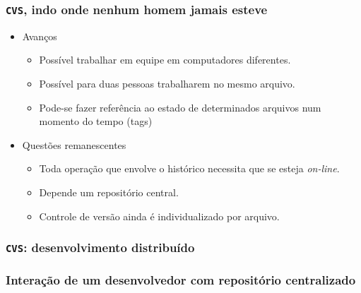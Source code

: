 \documentclass{beamer}
\newcommand{\cvs}{\texttt{CVS}}
\begin{document}
\begin{frame}
  \frametitle{\cvs, indo onde nenhum homem jamais esteve}
  \begin{itemize}
    \item Avanços
      \begin{itemize}
        \item Possível trabalhar em equipe em computadores
          diferentes.
        \item Possível para duas pessoas trabalharem no mesmo arquivo.
        \item Pode-se fazer referência ao estado de determinados
          arquivos num momento do tempo (tags)
      \end{itemize}
    \item Questões remanescentes
      \begin{itemize}
        \item Toda operação que envolve o histórico necessita que se
          esteja \emph{on-line}.
        \item Depende um repositório central.
        \item Controle de versão ainda é individualizado por arquivo.
      \end{itemize}
  \end{itemize}
\end{frame}

\begin{frame}
  \frametitle{\cvs: desenvolvimento distribuído}
  \begin{figure}[h]
    \begin{center}
    \end{center}
    \label{fig:cvs}
  \end{figure}
\end{frame}

\begin{frame}
  \frametitle{Interação de um desenvolvedor com repositório centralizado}
  \begin{figure}[h]
    \begin{center}
    \end{center}
    \label{fig:centralized-interaction}
  \end{figure}
\end{frame}
\end{document}

